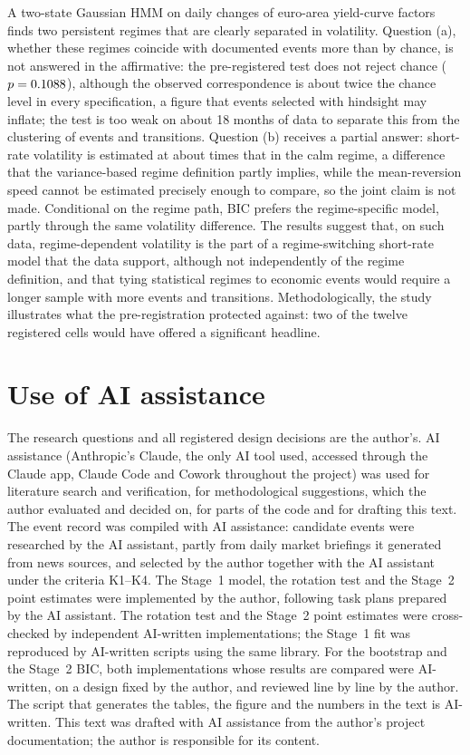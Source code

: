\documentclass[11pt,a4paper]{article}
\begin{document}
A two-state Gaussian HMM on daily changes of euro-area yield-curve factors finds two persistent regimes that are clearly separated in volatility. Question (a), whether these regimes coincide with documented events more than by chance, is not answered in the affirmative: the pre-registered test does not reject chance ($p=0.1088$), although the observed correspondence is about twice the chance level in every specification, a figure that events selected with hindsight may inflate; the test is too weak on about 18 months of data to separate this from the clustering of events and transitions. Question (b) receives a partial answer: short-rate volatility is estimated at about \PtsRatioRound{} times that in the calm regime, a difference that the variance-based regime definition partly implies, while the mean-reversion speed cannot be estimated precisely enough to compare, so the joint claim is not made. Conditional on the regime path, BIC prefers the regime-specific model, partly through the same volatility difference. The results suggest that, on such data, regime-dependent volatility is the part of a regime-switching short-rate model that the data support, although not independently of the regime definition, and that tying statistical regimes to economic events would require a longer sample with more events and transitions. Methodologically, the study illustrates what the pre-registration protected against: two of the twelve registered cells would have offered a significant headline.

\section*{Use of AI assistance}
The research questions and all registered design decisions are the author's. AI assistance (Anthropic's Claude, the only AI tool used, accessed through the Claude app, Claude Code and Cowork throughout the project) was used for literature search and verification, for methodological suggestions, which the author evaluated and decided on, for parts of the code and for drafting this text. The event record was compiled with AI assistance: candidate events were researched by the AI assistant, partly from daily market briefings it generated from news sources, and selected by the author together with the AI assistant under the criteria K1--K4. The Stage~1 model, the rotation test and the Stage~2 point estimates were implemented by the author, following task plans prepared by the AI assistant. The rotation test and the Stage~2 point estimates were cross-checked by independent AI-written implementations; the Stage~1 fit was reproduced by AI-written scripts using the same library. For the bootstrap and the Stage~2 BIC, both implementations whose results are compared were AI-written, on a design fixed by the author, and reviewed line by line by the author. The script that generates the tables, the figure and the numbers in the text is AI-written. This text was drafted with AI assistance from the author's project documentation; the author is responsible for its content.
\end{document}
